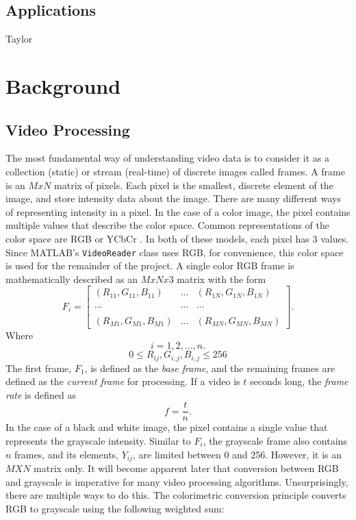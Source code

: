 \documentclass[12pt]{article} %
\begin{document}
\subsection{Applications}
Taylor
\section{Background}
\subsection{Video Processing}
The most fundamental way of understanding video data is to consider it as a collection (static) or stream (real-time) of discrete images called frames. A frame is an $MxN$ matrix of pixels. Each pixel is the smallest, discrete element of the image, and store intensity data about the image. There are many different ways of representing intensity in a pixel. In the case of a color image, the pixel contains multiple values that describe the color space. Common representations of the color space are RGB or YCbCr \cite{1}. In both of these models, each pixel has 3 values.  Since MATLAB's \texttt{VideoReader} class uses RGB, for convenience, this color space is used for the remainder of the project. A single color RGB frame is mathematically described as an $MxNx3$ matrix with the form
\begin{equation}
F_i = 
\begin{bmatrix}
(R_{11}, G_{11}, B_{11}) & ... & (R_{1N}, G_{1N}, B_{1N}) \\
 & &\\
... & ... & ... \\
 & &\\
(R_{M1}, G_{M1}, B_{M1}) & ... & (R_{MN}, G_{MN}, B_{MN}) 
\end{bmatrix}
.
\end{equation}
Where
\[
i = 1, 2, ... , n.
\]
\[
0 \leq R_{ij}, G_{i,j}, B_{i,j} \leq 256
\]
The first frame, $F_1$, is defined as the \textit{base frame}, and the remaining frames are defined as the \textit{current frame} for processing. If a video is $t$ seconds long, the \textit{frame rate }is defined as
\begin{equation}
f = \frac{t}{n}.
\label{eq:framerate}
\end{equation}
In the case of a black and white image, the pixel contains a single value that represents the grayscale intensity. Similar to $F_i$, the grayscale frame also contains $n$ frames, and its elements, $Y_{ij}$, are limited between 0 and 256. However, it is an $MXN$ matrix only. It will become apparent later that conversion between RGB and grayscale is imperative for many video processing algorithms. Unsurprisingly, there are multiple ways to do this. The colorimetric conversion principle converts RGB to grayscale using the following weighted sum:
\end{document}
